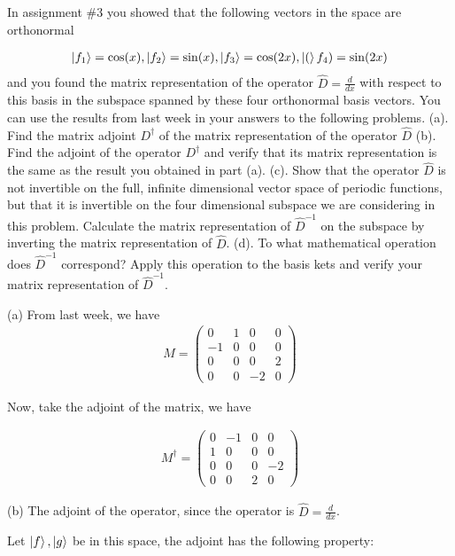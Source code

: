 \documentclass{article}
\begin{document}
In assignment \#3 you showed that the following vectors in the space are orthonormal

\begin{align*}
\ket{f_1} = \cos(x), \ket{f_2} = \sin(x), \ket{f_3} = \cos(2x), \ket(f_4) = \sin(2x) 
\end{align*}
and you found the matrix representation of the operator $\hat{D} = \frac{d}{dx}$ with respect to this
basis in the subspace spanned by these four orthonormal basis vectors. You can use the results from last week in your answers to the following problems.
(a). Find the matrix adjoint $D^{\dagger}$ of the matrix representation of the operator $\hat{D}$
(b). Find the adjoint of the operator $D^{\dagger}$ and verify that its matrix representation is the same
as the result you obtained in part (a).
(c). Show that the operator $\hat{D}$ is not invertible on the full, infinite dimensional vector
space of periodic functions, but that it is invertible on the four dimensional subspace we
are considering in this problem. Calculate the matrix representation of ${\hat{D}}^{-1}$ on the subspace by inverting the matrix representation of $\hat{D}$.
(d). To what mathematical operation does ${\hat{D}}^{-1}$ correspond? Apply this operation to the basis kets and verify your matrix representation of ${\hat{D}}^{-1}$.

(a) From last week, we have \begin{align*}
M = \begin{pmatrix}
0 & 1 & 0 & 0 \\ -1 & 0 & 0 & 0 \\ 0 & 0 & 0 & 2 \\ 0 & 0 & -2 & 0 
\end{pmatrix}
\end{align*}

Now, take the adjoint of the matrix, we have 

\begin{align*}
{M}^{\dagger} = \begin{pmatrix}
0 & -1 & 0 & 0 \\ 1 & 0 & 0 & 0 \\ 0 & 0 & 0 & -2 \\ 0 & 0 & 2 & 0
\end{pmatrix}
\end{align*}

(b) The adjoint of the operator, since the operator is $\hat{D} = \frac{d}{dx}$. 

Let $\ket{f}, \ket{g}$ be in this space, the adjoint has the following property: 
\end{document}
